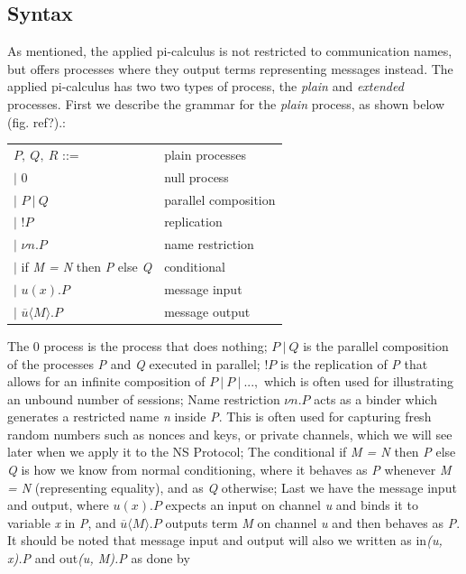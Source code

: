 \subsection{Syntax}
As mentioned, the applied pi-calculus is not restricted to communication names, but offers processes where they output terms representing messages instead. The applied pi-calculus has two two types of process, the \textit{plain} and \textit{extended} processes. First we describe the grammar for the \textit{plain} process, as shown below (fig. ref?).:  %
\begin{center}
	\begin{tabular} { l l }
 		$P,\ Q,\ R$ ::= & plain processes \\ 
 		\quad $|$ 0 & null process \\  
 		\quad $|$ $P\ |\ Q$ & parallel composition \\
 		\quad $|$ !$P$ & replication \\
		\quad $|$ $\nu n.P$ & name restriction \\
		\quad $|$ if \textit{M = N} then \textit{P} else \textit{Q} & conditional \\
		\quad $|$ $u(x).P$ & message input \\
		\quad $|$ $\overline{u}\langle M\rangle .P $ & message output 
	\end{tabular}
\end{center}
The 0 process is the process that does nothing; $P\ |\ Q$ is the parallel composition of the processes \textit{P} and \textit{Q} executed in parallel; !$P$ is the replication of \textit{P} that allows for an infinite composition of $P\ |\ P\ |\ ...,$ which is often used for illustrating an unbound number of sessions; Name restriction $\nu n.P$ acts as a binder which generates a restricted name \textit{n} inside \textit{P}. This is often used for capturing fresh random numbers such as nonces and keys, or private channels, which we will see later when we apply it to the NS Protocol; The conditional if \textit{M = N} then \textit{P} else \textit{Q} is how we know from normal conditioning, where it behaves as \textit{P} whenever \textit{M = N} (representing equality), and as \textit{Q} otherwise; Last we have the message input and output, where $u(x).P$ expects an input on channel \textit{u} and binds it to variable \textit{x} in \textit{P}, and $\overline{u}\langle M\rangle .P $ outputs term \textit{M} on channel \textit{u} and then behaves as \textit{P}. It should be noted that message input and output will also we written as in\textit{(u, x).P} and out\textit{(u, M).P} as done by \citeauthor{DBLP:journals/ftpl/CortierK14} \\


